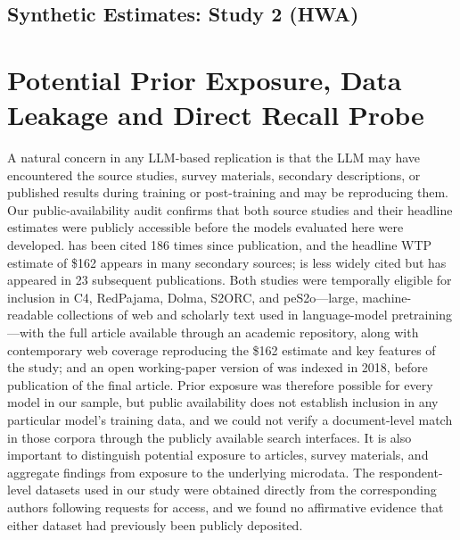 \documentclass[12pt]{article}
\begin{document}


\label{tab:full-results}


\newpage
\subsection{Synthetic Estimates: Study 2 (HWA)}\label{app:tables-hwa}






%


\section{Potential Prior Exposure, Data Leakage and Direct Recall Probe}
\label{app:leakage}

A natural concern in any LLM-based replication is that the LLM may have encountered the source studies, survey materials, secondary descriptions,
or published results during training or post-training and may be reproducing them. Our public-availability audit confirms that both source studies and their headline estimates were publicly accessible before the models evaluated here were developed. \textcite{Aldy2012} has been cited 186 times since publication, and the headline WTP estimate of \$162 appears in many secondary sources; \textcite{Giguere2020} is less widely cited but has appeared in 23 subsequent publications. Both studies were temporally eligible for inclusion in C4, RedPajama, Dolma, S2ORC, and peS2o---large,
machine-readable collections of web and scholarly text used in language-model pretraining---with the full \textcite{Aldy2012} article available through an academic repository, along with contemporary web coverage reproducing the \$162 estimate and key features of the study; and an open working-paper version of \textcite{Giguere2020} was indexed in 2018, before publication of the final article. Prior exposure was therefore possible for every model in our sample, but public availability does not establish inclusion in any particular model's training data, and we could not verify a document-level match in those corpora through the publicly available search interfaces. It is also important to distinguish potential exposure to articles, survey materials, and aggregate findings from exposure to the underlying microdata. The respondent-level datasets used in our study were obtained directly from the corresponding authors following requests for access, and we found no affirmative evidence that either dataset had previously been publicly deposited.
\end{document}
